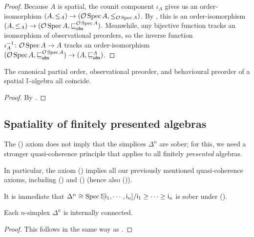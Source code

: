 \begin{proof}
  Because $A$ is spatial, the counit component $\iota_A$ gives us an order-isomorphism ${(A,\le_A)}\to (\mathcal{O}\operatorname{Spec}{A},\le_{\mathcal{O}\operatorname{Spec}{A}})$. By , this is an order-isomorphism ${(A,\le_A)}\to {(\opens\spec{A},\obsle[\opens\spec{A}])}$. Meanwhile, any bijective function tracks an isomorphism of observational preorders, so the inverse function $\iota_A^{-1}\colon \mathcal{O}\operatorname{Spec}{A}\to A$ tracks an order-isomorphism  ${(\opens\spec{A},\obsle[\opens\spec{A}])}\to {(A,\obsle[A])}$. 
\end{proof}

\begin{corollary}[\AxiomSQCP]
  The canonical partial order, observational preorder, and behavioural preorder of a spatial $\mathbb{I}$-algebra all coincide.
\end{corollary}

\begin{proof}
  By .
\end{proof}


\subsection{Spatiality of finitely presented algebras}

The (\AxiomSQCP) axiom does not imply that the simplices $\Delta^n$ are sober; for this, we need a stronger quasi-coherence principle that applies to all finitely \emph{presented} algebras.


\PrintAxiomSQCF

\begin{remark}
  In particular, the axiom (\AxiomSQCF) implies all our previously mentioned quasi-coherence axioms, including (\AxiomSQCP) and (\AxiomSQCID) (hence also (\AxiomSQCI)).
\end{remark}

It is immediate that $\Delta^n\cong \operatorname{Spec}\mathbb{I}[\mathsf{i}_1,\cdots,\mathsf{i}_n]/\mathsf{i}_1\geq \cdots \geq \mathsf{i}_n$ is sober under (\AxiomSQCF).

\begin{corollary}[\AxiomSQCF]
  Each $n$-simplex $\Delta^n$ is internally connected.
\end{corollary}

\begin{proof}
  This follows in the same way as .
\end{proof}

